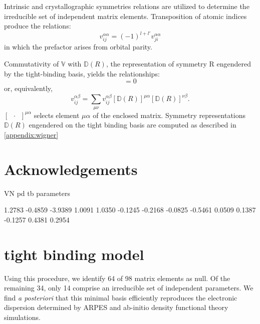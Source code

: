 \documentclass[twocolumn,showpacs,preprintnumbers,superscriptaddress,prb,floatfix,aps,10pt]{revtex4-1}
\newcommand*{\wignerD}{\mathbb{D}(R)}
\begin{document}
Intrinsic and crystallographic symmetries relations are utilized to determine the irreducible set of independent matrix elements. Transposition of atomic indices produce the relations:
\begin{equation}
\label{eq:transposition}
v_{ij}^{\alpha\alpha} = (-1)^{l+l'}v_{ji}^{\alpha\alpha}
\end{equation}
in which the prefactor arises from orbital parity.

Commutativity of $\mathbb{V}$ with $\wignerD$, the representation of symmetry R engendered by the tight-binding basis, yields the relationships:
\begin{equation}
[\mathbb{V},\wignerD] = 0
\end{equation}
or, equivalently,
\begin{equation}
\label{eq:stab}
v_{ij}^{\alpha\beta} = \sum_{\mu\nu} v_{ij}^{\alpha\beta} \left[\wignerD\right]^{\mu\alpha} \left[\wignerD\right]^{\nu\beta}.
\end{equation}
$\left[\phantom{a}\cdot\phantom{a}\right] ^{\mu\alpha}$ selects element $\mu\alpha$ of the enclosed matrix. Symmetry representations $\wignerD$ engendered on the tight binding basis are computed as described in \ref{appendix:wigner}

\section{Acknowledgements}



\clearpage

VN pd tb parameters

    1.2783
   -0.4859
   -3.9389
    1.0091
    1.0350
   -0.1245
   -0.2168
   -0.0825
   -0.5461
    0.0509
    0.1387
   -0.1257
    0.4381
    0.2954




\appendix


\section{tight binding model}\label{appendix:tb}




Using this procedure, we identify 64 of 98 matrix elements as null. Of the remaining 34, only 14 comprise an irreducible set of independent parameters. We find \emph{a posteriori} that this minimal basis efficiently reproduces the electronic dispersion determined by ARPES and ab-initio density functional theory simulations.
\end{document}
